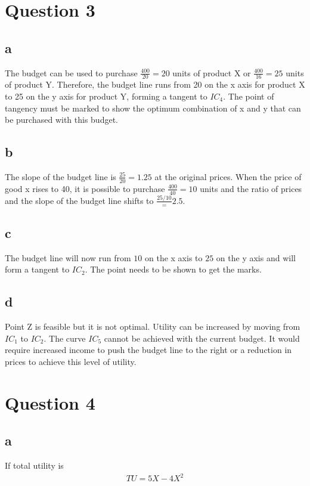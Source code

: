 \documentclass[12pt, a4paper, oneside]{article}\usepackage{graphicx, color}
\begin{document}
\section*{Question 3}
\subsection*{a}
The budget can be used to purchase $\frac{400}{20} = 20$ units of product X or $\frac{400}{16} = 25$ units of product Y.  Therefore, the budget line runs from 20 on the x axis for product X to 25 on the y axis for product Y, forming a tangent to $IC_4$.  The point of tangency must be marked to show the optimum combination of x and y that can be purchased with this budget. 

\subsection*{b}
The slope of the budget line is $\frac{25}{20} = 1.25$ at the original prices.  When the price of good x rises to 40, it is possible to purchase $\frac{400}{40} = 10$ units and the ratio of prices and the slope of the budget line shifts to $\frac{25/10} = 2.5$.  

\subsection*{c}
The budget line will now run from $10$ on the x axis to $25$ on the y axis and will form a tangent to $IC_2$.  The point needs to be shown to get the marks.

\subsection*{d}
Point Z is feasible but it is not optimal.  Utility can be increased by moving from $IC_1$ to $IC_2$.  The curve $IC_5$ cannot be achieved with the current budget.  It would require increased income to push the budget line to the right or a reduction in prices to achieve this level of utility. 

\section*{Question 4}
\subsection*{a}
If total utility is
\begin{align*}
TU = 5X - 4X^2
\end{align*}
\end{document}
